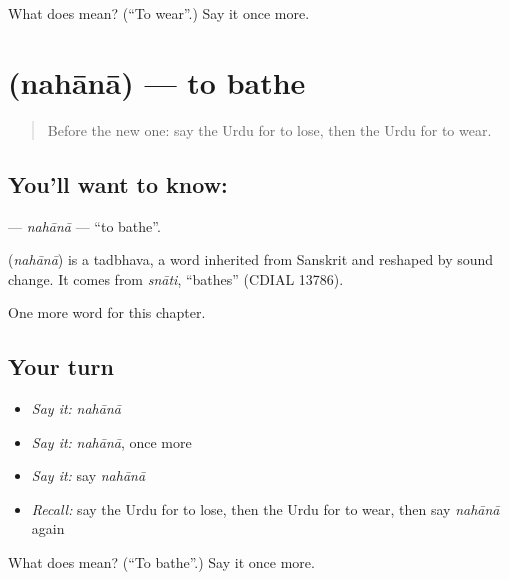 \begin{tcolorbox}[breakable,colback=teal!4,colframe=teal!35!black,title={Before you move on}]
What does  mean? (\textquotedblleft{}To wear\textquotedblright{}.) Say it once more.
\end{tcolorbox}
\section[\texorpdfstring{\ur{نہانا} (nahānā)}{نہانا (nahānā)}]{ (nahānā) — to bathe}

\label{lesson:UR-C53-nahana}



\begin{quote}
Before the new one: say the Urdu for to lose, then the Urdu for to wear.
\end{quote}

\subsection*{You'll want to know: }
\textbf{} — \emph{nahānā} — \textquotedblleft{}to bathe\textquotedblright{}.

\begin{cousinweb}
\textbf{} (\emph{nahānā}) is a tadbhava, a word inherited from Sanskrit and reshaped by sound change. It comes from \emph{snāti}, \textquotedblleft{}bathes\textquotedblright{} (CDIAL 13786).
\end{cousinweb}

\begin{grammarlens}[title={What you've built}]
One more word for this chapter.
\end{grammarlens}

\subsection*{Your turn}
\begin{itemize}
\raggedright
  \item \emph{Say it:} \emph{nahānā}
  \item \emph{Say it:} \emph{nahānā}, once more
  \item \emph{Say it:} say \emph{nahānā}
  \item \emph{Recall:} say the Urdu for to lose, then the Urdu for to wear, then say \emph{nahānā} again
\end{itemize}

\begin{tcolorbox}[breakable,colback=teal!4,colframe=teal!35!black,title={Before you move on}]
What does  mean? (\textquotedblleft{}To bathe\textquotedblright{}.) Say it once more.
\end{tcolorbox}
